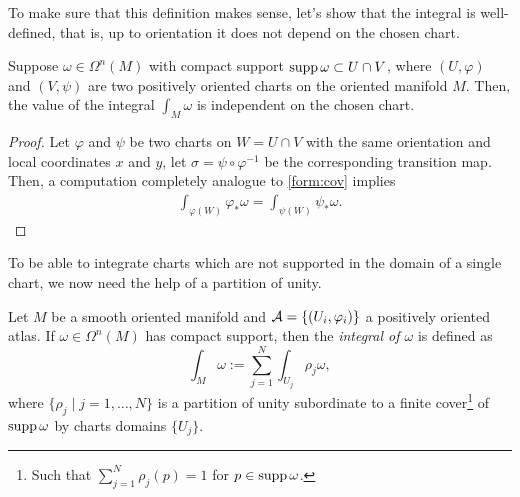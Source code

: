 To make sure that this definition makes sense, let's show that the integral is well-defined, that is, up to orientation it does not depend on the chosen chart.

\begin{lemma}\label{lemma:intindep:chart}
	Suppose $\omega\in\Omega^n(M)$ with compact support $\operatorname{supp} \omega \subset U\cap V$, where $(U, \varphi)$ and $(V, \psi)$ are two positively oriented charts on the oriented manifold $M$.
	Then, the value of the integral $\int_M\omega$ is independent on the chosen chart.
\end{lemma}
\begin{proof}
	Let $\varphi$ and $\psi$ be two charts on $W = U\cap V$ with the same orientation and local coordinates $x$ and $y$, let $\sigma = \psi\circ\varphi^{-1}$ be the corresponding transition map.
	Then, a computation completely analogue to \eqref{form:cov} implies
	\begin{align}
		\int_{\varphi(W)} \varphi_*\omega = \int_{\psi(W)} \psi_*\omega.
	\end{align}
\end{proof}

To be able to integrate charts which are not supported in the domain of a single chart, we now need the help of a partition of unity.

\begin{definition}
	Let $M$ be a smooth oriented manifold and $\mathcal{A} = \{(U_i,\varphi_i)\}$ a positively oriented atlas.
	If $\omega \in \Omega^n(M)$ has compact support, then the \emph{integral of $\omega$} is defined as
	\begin{equation}\label{eq:intnform}
		\int_M \omega := \sum_{j=1}^N \int_{U_j}\rho_j\omega,
	\end{equation}
	where $\{\rho_j\mid j=1,\ldots, N\}$ is a partition of unity subordinate to a finite cover\footnote{Such that $\sum_{j=1}^N \rho_j(p) = 1$ for $p\in\operatorname{supp}\omega$.} of $\operatorname{supp} \omega$ by charts domains $\{U_j\}$.
\end{definition}

